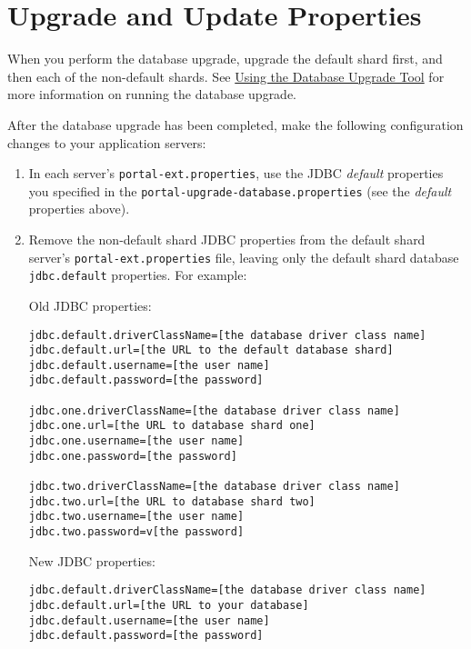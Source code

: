 \section{Upgrade and Update
Properties}\label{upgrade-and-update-properties}

When you perform the database upgrade, upgrade the default shard first,
and then each of the non-default shards. See
\href{/docs/7-2/deploy/-/knowledge_base/d/upgrading-the-product-data}{Using
the Database Upgrade Tool} for more information on running the database
upgrade.

After the database upgrade has been completed, make the following
configuration changes to your application servers:

\begin{enumerate}
\def\labelenumi{\arabic{enumi}.}
\item
  In each server's \texttt{portal-ext.properties}, use the JDBC
  \emph{default} properties you specified in the
  \texttt{portal-upgrade-database.properties} (see the \emph{default}
  properties above).
\item
  Remove the non-default shard JDBC properties from the default shard
  server's \texttt{portal-ext.properties} file, leaving only the default
  shard database \texttt{jdbc.default} properties. For example:

  Old JDBC properties:

\begin{verbatim}
jdbc.default.driverClassName=[the database driver class name]
jdbc.default.url=[the URL to the default database shard]
jdbc.default.username=[the user name]
jdbc.default.password=[the password]

jdbc.one.driverClassName=[the database driver class name]
jdbc.one.url=[the URL to database shard one]
jdbc.one.username=[the user name]
jdbc.one.password=[the password]

jdbc.two.driverClassName=[the database driver class name]
jdbc.two.url=[the URL to database shard two]
jdbc.two.username=[the user name]
jdbc.two.password=v[the password]
\end{verbatim}

  New JDBC properties:

\begin{verbatim}
jdbc.default.driverClassName=[the database driver class name]
jdbc.default.url=[the URL to your database]
jdbc.default.username=[the user name]
jdbc.default.password=[the password]
\end{verbatim}
\end{enumerate}

